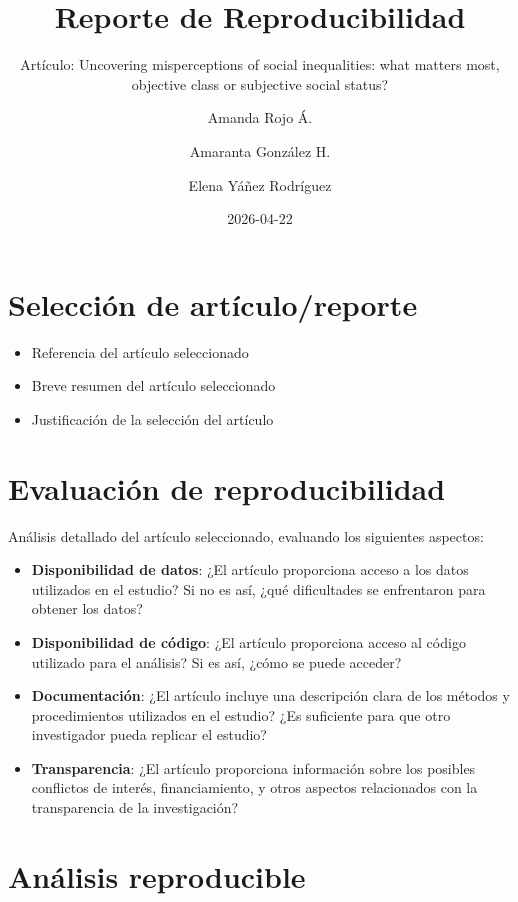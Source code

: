\documentclass[
  spanish,
  13pt,
  letterpaper,
  DIV=11,
  numbers=noendperiod]{scrartcl}
\title{Reporte de Reproducibilidad}
\subtitle{Artículo: Uncovering misperceptions of social inequalities:
what matters most, objective class or subjective social status?}
\author{Amanda Rojo Á. \and Amaranta González H. \and Elena Yáñez
Rodríguez}
\date{2026-04-22}
\providecommand{\tightlist}{%
  \setlength{\itemsep}{0pt}\setlength{\parskip}{0pt}}
\renewcommand*\contentsname{Tabla de contenidos}
\newcommand\contentsname{Tabla de contenidos}
\begin{document}
\maketitle

\renewcommand*\contentsname{Tabla de contenidos}
{
\setcounter{tocdepth}{3}
\tableofcontents
}

\section{Selección de
artículo/reporte}\label{selecciuxf3n-de-artuxedculoreporte}

\begin{itemize}
\tightlist
\item
  Referencia del artículo seleccionado
\item
  Breve resumen del artículo seleccionado
\item
  Justificación de la selección del artículo
\end{itemize}

\section{Evaluación de
reproducibilidad}\label{evaluaciuxf3n-de-reproducibilidad}

Análisis detallado del artículo seleccionado, evaluando los siguientes
aspectos:

\begin{itemize}
\tightlist
\item
  \textbf{Disponibilidad de datos}: ¿El artículo proporciona acceso a
  los datos utilizados en el estudio? Si no es así, ¿qué dificultades se
  enfrentaron para obtener los datos?
\item
  \textbf{Disponibilidad de código}: ¿El artículo proporciona acceso al
  código utilizado para el análisis? Si es así, ¿cómo se puede acceder?
\item
  \textbf{Documentación}: ¿El artículo incluye una descripción clara de
  los métodos y procedimientos utilizados en el estudio? ¿Es suficiente
  para que otro investigador pueda replicar el estudio?
\item
  \textbf{Transparencia}: ¿El artículo proporciona información sobre los
  posibles conflictos de interés, financiamiento, y otros aspectos
  relacionados con la transparencia de la investigación?
\end{itemize}

\section{Análisis reproducible}\label{anuxe1lisis-reproducible}
\end{document}
